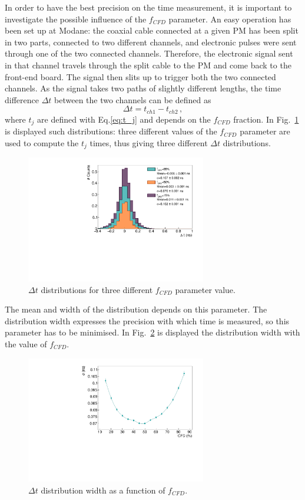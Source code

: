 In order to have the best precision on the time measurement, it is important to investigate the possible influence of the $f_{CFD}$ parameter.
An easy operation has been set up at Modane: the coaxial cable connected at a given PM has been split in two parts, connected to two different channels, and electronic pulses were sent through one of the two connected channels.
Therefore, the electronic signal sent in that channel travels through the split cable to the PM and come back to the front-end board.
The signal then slits up to trigger both the two connected channels.
As the signal takes two paths of slightly different lengths, the time difference $\Delta t$ between the two channels can be defined as
\begin{equation}
  \Delta t = t_{ch1}-t_{ch2}\,,
\end{equation}
where $t_{j}$ are defined with Eq.\eqref{eq:t_j} and depends on the $f_{CFD}$ fraction.
In Fig.~\ref{fig:deltat_CFD} is displayed such distributions: three different values of the $f_{CFD}$ parameter are used to compute the $t_{j}$ times, thus giving three different $\Delta t$ distributions.
\begin{figure}[h!]
  \centering
  \includegraphics[width=0.7\textwidth]{commissioning/fig_commissioning/deltat.pdf}
  \caption{$\Delta t$ distributions for three different $f_{CFD}$ parameter value.
    \label{fig:deltat_CFD}}
\end{figure}
The mean and width of the distribution depends on this parameter.
The distribution width expresses the precision with which time is measured, so this parameter has to be minimised.
In Fig.~\ref{fig:CFD_study} is displayed the distribution width with the value of $f_{CFD}$.
\begin{figure}[h!]
  \centering
  \includegraphics[width=0.7\textwidth]{commissioning/fig_commissioning/CFD_study.pdf}
  \caption{$\Delta t$ distribution width as a function of $f_{CFD}$.
    \label{fig:CFD_study}}
\end{figure}
